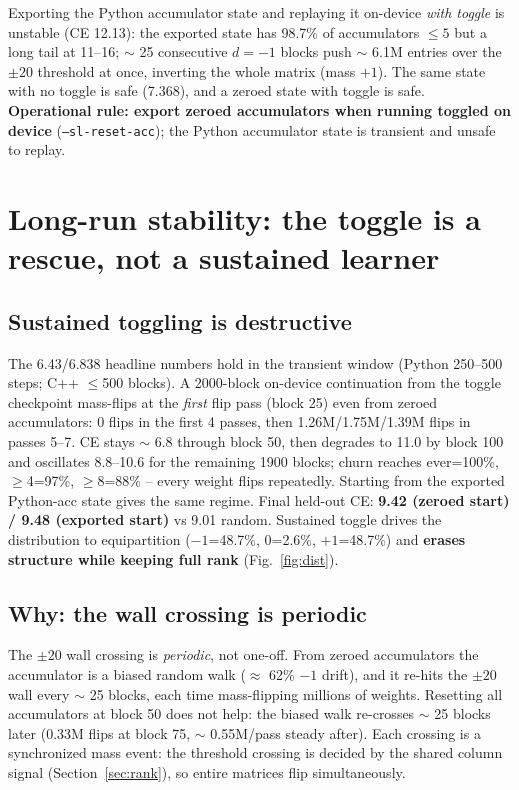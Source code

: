 \documentclass{article} %
\begin{document}
Exporting the Python accumulator state and replaying it on-device \emph{with toggle} is unstable (CE 12.13): the exported state has 98.7\% of accumulators $\le 5$ but a long tail at 11--16; $\sim$ 25 consecutive $d=-1$ blocks push $\sim$ 6.1M entries over the $\pm20$ threshold at once, inverting the whole matrix (mass $+1$). The same state with no toggle is safe (7.368), and a zeroed state with toggle is safe. \textbf{Operational rule: export zeroed accumulators when running toggled on device} (\texttt{--sl-reset-acc}); the Python accumulator state is transient and unsafe to replay.

\section{Long-run stability: the toggle is a rescue, not a sustained learner}
\label{sec:longrun}

\subsection{Sustained toggling is destructive}
\label{sec:sustained}

The 6.43/6.838 headline numbers hold in the transient window (Python 250--500 steps; C++ $\le$500 blocks). A 2000-block on-device continuation from the toggle checkpoint mass-flips at the \emph{first} flip pass (block 25) even from zeroed accumulators: 0 flips in the first 4 passes, then 1.26M/1.75M/1.39M flips in passes 5--7. CE stays $\sim$ 6.8 through block 50, then degrades to 11.0 by block 100 and oscillates 8.8--10.6 for the remaining 1900 blocks; churn reaches ever=100\%, $\ge$4=97\%, $\ge$8=88\% -- every weight flips repeatedly. Starting from the exported Python-acc state gives the same regime. Final held-out CE: \textbf{9.42 (zeroed start) / 9.48 (exported start)} vs 9.01 random. Sustained toggle drives the distribution to equipartition ($-1$=48.7\%, 0=2.6\%, $+1$=48.7\%) and \textbf{erases structure while keeping full rank} (Fig.~\ref{fig:dist}).

\subsection{Why: the wall crossing is periodic}
\label{sec:periodic}

The $\pm20$ wall crossing is \emph{periodic}, not one-off. From zeroed accumulators the accumulator is a biased random walk ($\approx$ 62\% $-1$ drift), and it re-hits the $\pm20$ wall every $\sim$ 25 blocks, each time mass-flipping millions of weights. Resetting all accumulators at block 50 does not help: the biased walk re-crosses $\sim$ 25 blocks later (0.33M flips at block 75, $\sim$ 0.55M/pass steady after). Each crossing is a synchronized mass event: the threshold crossing is decided by the shared column signal (Section~\ref{sec:rank}), so entire matrices flip simultaneously.
\end{document}
